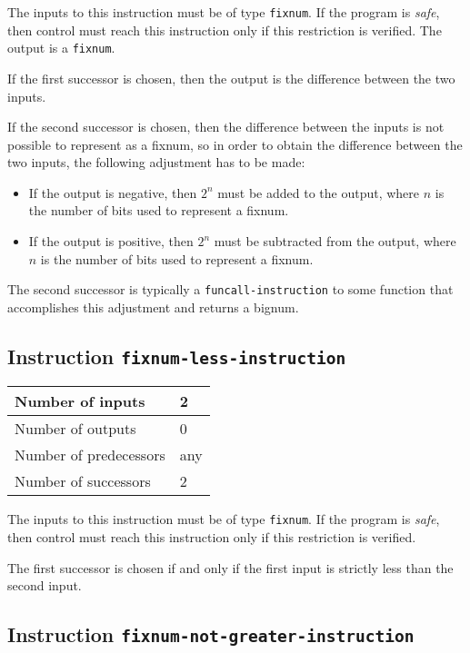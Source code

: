 The inputs to this instruction must be of type \texttt{fixnum}.  If
the program is \emph{safe}, then control must reach this instruction
only if this restriction is verified.  The output is a
\texttt{fixnum}.

If the first successor is chosen, then the output is the difference
between the two inputs.

If the second successor is chosen, then the difference between the
inputs is not possible to represent as a fixnum, so in order to obtain
the difference between the two inputs, the following adjustment has to
be made:

\begin{itemize}
\item If the output is negative, then $2^n$ must be added to the
  output, where $n$ is the number of bits used to represent a fixnum. 
\item If the output is positive, then $2^n$ must be subtracted from
  the output, where $n$ is the number of bits used to represent a
  fixnum.
\end{itemize}

The second successor is typically a \texttt{funcall-instruction} to
some function that accomplishes this adjustment and returns a bignum.

\subsection{Instruction \texttt{fixnum-less-instruction}}
\label{hir-instruction-fixnum-less}

\begin{tabular}{|l|l|}
\hline
Number of inputs & 2\\
\hline
Number of outputs & 0\\
\hline
Number of predecessors & any\\
\hline
Number of successors & 2\\
\hline
\end{tabular}

The inputs to this instruction must be of type \texttt{fixnum}.  If
the program is \emph{safe}, then control must reach this instruction
only if this restriction is verified.

The first successor is chosen if and only if the first input is
strictly less than the second input.

\subsection{Instruction \texttt{fixnum-not-greater-instruction}}
\label{hir-instruction-fixnum-le}

